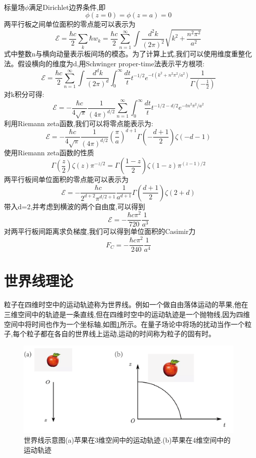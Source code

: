\paragraph*{}
标量场$\phi$满足Dirichlet边界条件,即
$$
\phi(z=0)=\phi(z=a)=0
$$
两平行板之间单位面积的零点能可以表示为
$$
\mathcal{E} =\frac{\hbar c}{2}\sum_k{\hbar w_k}=\frac{\hbar c}{2}\sum_{n=1}^{\infty}{\int{\frac{d^2k}{\left( 2\pi \right) ^2}\sqrt{k^2+\frac{n^2\pi ^2}{a^2}}}}
$$
式中整数n与横向动量表示板间场的模态。为了计算上式,我们可以使用维度重整化法。假设横向的维度为d,用Schwinger proper-time法表示平方根项:
$$
\mathcal{E} =\frac{\hbar c}{2}\sum_{n=1}^{\infty}{\int{\frac{d^dk}{\left( 2\pi \right) ^d}\int_0^{\infty}{\frac{dt}{t}t^{-1/2}e^{-t\left( k^2+n^2\pi ^2/a^2 \right)}}}}\frac{1}{\varGamma \left( -\frac{1}{2} \right)}
$$
对k积分可得:
$$
\mathcal{E} =-\frac{\hbar c}{4\sqrt{\pi}}\frac{1}{\left( 4\pi \right) ^{d/2}}\sum_{n=1}^{\infty}{\int_0^{\infty}{\frac{dt}{t}t^{-1/2-d/2}e^{-tn^2\pi ^2/a^2}}}
$$
利用Riemann zeta函数,我们可以将零点能表示为:
$$
\mathcal{E} =-\frac{\hbar c}{4\sqrt{\pi}}\frac{1}{\left( 4\pi \right) ^{d/2}}\left( \frac{\pi}{a} \right) ^{d+1}\varGamma \left( -\frac{d+1}{2} \right) \zeta \left( -d-1 \right) 
$$
使用Riemann zeta函数的性质
$$
\varGamma \left( \frac{z}{2} \right) \zeta \left( z \right) \pi ^{-z/2}=\varGamma \left( \frac{1-z}{2} \right) \zeta \left( 1-z \right) \pi ^{\left( z-1 \right) /2}
$$
两平行板间单位面积的零点能可以表示为
$$
\mathcal{E} =-\frac{\hbar c}{2^{d+2}\pi ^{d/2+1}}\frac{1}{a^{d+1}}\varGamma \left( \frac{d+1}{2} \right) \zeta \left( 2+d \right) 
$$
带入d=2,并考虑到横波的两个自由度,可以得到
$$
\mathcal{E} =-\frac{\hbar c \pi ^2}{720}\frac{1}{a^3}
$$
对两平行板间距离求负梯度,我们可以得到单位面积的Casimir力
$$
F_C=-\frac{\hbar c\pi ^2}{240}\frac{1}{a^4}
$$



\section{世界线理论}
粒子在四维时空中的运动轨迹称为世界线。例如一个做自由落体运动的苹果,他在三维空间中的轨迹是一条直线,但在四维时空中的运动轨迹是一个抛物线,因为四维空间中将时间也作为一个坐标轴,如图\ref{fig:4}所示。在量子场论中将场的扰动当作一个粒子,每个粒子都在各自的世界线上运动,运动的时间称为粒子的固有时。
\begin{figure}[h]
	\centering
	\includegraphics[width=0.7\linewidth]{figures/世界线}
	\caption{世界线示意图(a)苹果在3维空间中的运动轨迹.(b)苹果在4维空间中的运动轨迹}
	\label{fig:4}
\end{figure}
